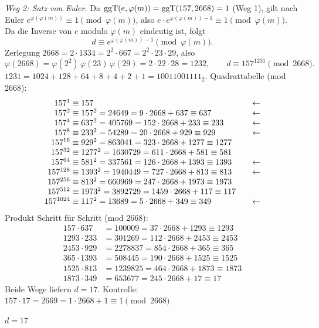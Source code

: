 \emph{Weg 2: Satz von Euler.} Da $\operatorname{ggT}(e, \varphi(m)) = \operatorname{ggT}(157, 2668) = 1$ (Weg 1), gilt nach Euler
$e^{\varphi(\varphi(m))} \equiv 1 \pmod{\varphi(m)}$, also $e \cdot e^{\varphi(\varphi(m)) - 1} \equiv 1 \pmod{\varphi(m)}$.
Da die Inverse von $e$ modulo $\varphi(m)$ eindeutig ist, folgt
\[
d \equiv e^{\varphi(\varphi(m)) - 1} \pmod{\varphi(m)} .
\]
Zerlegung $2668 = 2 \cdot 1334 = 2^2 \cdot 667 = 2^2 \cdot 23 \cdot 29$, also
\[
\varphi(2668) = \varphi(2^2)\,\varphi(23)\,\varphi(29) = 2 \cdot 22 \cdot 28 = 1232,
\qquad d \equiv 157^{1231} \pmod{2668}.
\]
$1231 = 1024 + 128 + 64 + 8 + 4 + 2 + 1 = 10011001111_2$.
Quadrattabelle (mod 2668):
\[
\begin{array}{r@{\;\equiv\;}l@{\qquad}l}
157^{1}    & 157 & \leftarrow\\
157^{2}    & 157^2 = 24649 = 9 \cdot 2668 + 637 \equiv 637 & \leftarrow\\
157^{4}    & 637^2 = 405769 = 152 \cdot 2668 + 233 \equiv 233 & \leftarrow\\
157^{8}    & 233^2 = 54289 = 20 \cdot 2668 + 929 \equiv 929 & \leftarrow\\
157^{16}   & 929^2 = 863041 = 323 \cdot 2668 + 1277 \equiv 1277 & \\
157^{32}   & 1277^2 = 1630729 = 611 \cdot 2668 + 581 \equiv 581 & \\
157^{64}   & 581^2 = 337561 = 126 \cdot 2668 + 1393 \equiv 1393 & \leftarrow\\
157^{128}  & 1393^2 = 1940449 = 727 \cdot 2668 + 813 \equiv 813 & \leftarrow\\
157^{256}  & 813^2 = 660969 = 247 \cdot 2668 + 1973 \equiv 1973 & \\
157^{512}  & 1973^2 = 3892729 = 1459 \cdot 2668 + 117 \equiv 117 & \\
157^{1024} & 117^2 = 13689 = 5 \cdot 2668 + 349 \equiv 349 & \leftarrow
\end{array}
\]
Produkt Schritt für Schritt (mod 2668):
\begin{align*}
157 \cdot 637 &= 100009 = 37 \cdot 2668 + 1293 \equiv 1293\\
1293 \cdot 233 &= 301269 = 112 \cdot 2668 + 2453 \equiv 2453\\
2453 \cdot 929 &= 2278837 = 854 \cdot 2668 + 365 \equiv 365\\
365 \cdot 1393 &= 508445 = 190 \cdot 2668 + 1525 \equiv 1525\\
1525 \cdot 813 &= 1239825 = 464 \cdot 2668 + 1873 \equiv 1873\\
1873 \cdot 349 &= 653677 = 245 \cdot 2668 + 17 \equiv 17
\end{align*}
Beide Wege liefern $d = 17$. Kontrolle: $157 \cdot 17 = 2669 = 1 \cdot 2668 + 1 \equiv 1 \pmod{2668}$ \checkmark
\begin{ergebnis} $d = 17$ \end{ergebnis}

